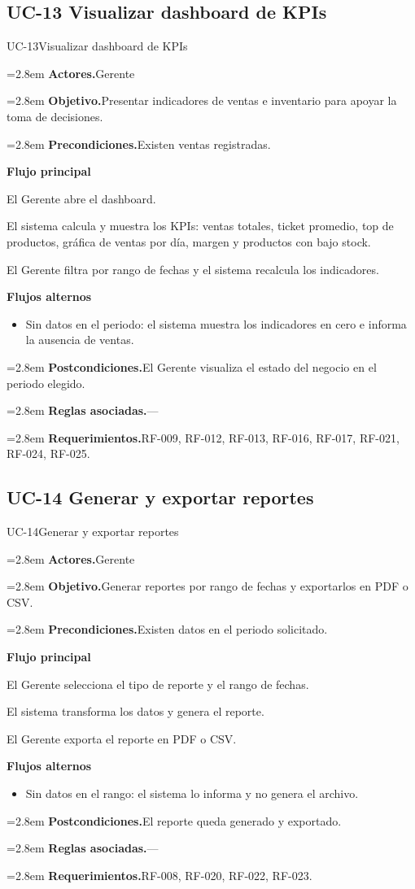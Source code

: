 \documentclass[11pt]{article}
\newcommand{\fila}[2]{\par\smallskip\noindent\hangindent=2.8em\hangafter=0
  \textbf{\sffamily\color{brand!80!black}#1.}\hspace{0.4em}#2\par}
\newcommand{\bloque}[1]{\par\smallskip\noindent\textbf{\sffamily\color{brand!80!black}#1}\par\nopagebreak}
\newenvironment{alternos}{\begin{itemize}[leftmargin=2.9em, itemsep=0.2ex, topsep=0.3ex]}{\end{itemize}}
\begin{document}
\subsection{UC-13 Visualizar dashboard de KPIs}
\begin{ficha}{UC-13}{Visualizar dashboard de KPIs}
\fila{Actores}{Gerente}
\fila{Objetivo}{Presentar indicadores de ventas e inventario para apoyar la toma de decisiones.}
\fila{Precondiciones}{Existen ventas registradas.}
\bloque{Flujo principal}
\begin{pasos}
  \item El Gerente abre el dashboard.
  \item El sistema calcula y muestra los KPIs: ventas totales, ticket promedio, top de productos, gráfica de ventas por día, margen y productos con bajo stock.
  \item El Gerente filtra por rango de fechas y el sistema recalcula los indicadores.
\end{pasos}
\bloque{Flujos alternos}
\begin{alternos}
  \item[\textbf{2a.}] Sin datos en el periodo: el sistema muestra los indicadores en cero e informa la ausencia de ventas.
\end{alternos}
\fila{Postcondiciones}{El Gerente visualiza el estado del negocio en el periodo elegido.}
\fila{Reglas asociadas}{---}
\fila{Requerimientos}{RF-009, RF-012, RF-013, RF-016, RF-017, RF-021, RF-024, RF-025.}
\end{ficha}

\subsection{UC-14 Generar y exportar reportes}
\begin{ficha}{UC-14}{Generar y exportar reportes}
\fila{Actores}{Gerente}
\fila{Objetivo}{Generar reportes por rango de fechas y exportarlos en PDF o CSV.}
\fila{Precondiciones}{Existen datos en el periodo solicitado.}
\bloque{Flujo principal}
\begin{pasos}
  \item El Gerente selecciona el tipo de reporte y el rango de fechas.
  \item El sistema transforma los datos y genera el reporte.
  \item El Gerente exporta el reporte en PDF o CSV.
\end{pasos}
\bloque{Flujos alternos}
\begin{alternos}
  \item[\textbf{2a.}] Sin datos en el rango: el sistema lo informa y no genera el archivo.
\end{alternos}
\fila{Postcondiciones}{El reporte queda generado y exportado.}
\fila{Reglas asociadas}{---}
\fila{Requerimientos}{RF-008, RF-020, RF-022, RF-023.}
\end{ficha}
\end{document}
